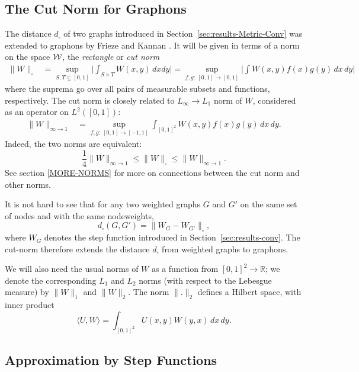 \documentclass[12pt]{article}
\numberwithin{equation}{section}
\def\IO{{\infty\to1}}
\def\R{{\mathbb R}}
\begin{document}
\subsection{The Cut Norm for Graphons}
\label{sec:func-norm}

The distance $d_\square$ of two graphs introduced in
Section~\ref{sec:results-Metric-Conv} was extended to graphons by
Frieze and Kannan \cite{FK}. It will be given in terms of a norm on
the space ${\cal W}$, the {\it rectangle} or {\it cut norm}
\begin{equation}\label{CUTNORM-W}
\begin{aligned}
\|W\|_\square &=\sup_{S,T\subseteq [0,1]} \biggl|\int_{S\times T}
W(x,y)\,dxdy\biggr| =\sup_{f,g:~[0,1]\to [0,1]}\biggl|\int
W(x,y)f(x)g(y)\,dx\,dy\biggr|
\end{aligned}
\end{equation}
where the suprema go over all pairs of measurable subsets and
functions, respectively. The cut norm is closely related to
$L_\infty\to L_1$ norm of $W$, considered as an operator on
$L^2([0,1])$:
\begin{align}\label{IONORM-W}
\|W\|_\IO &=\sup_{f,g:~[0,1]\to [-1,1]} \int_{[0,1]^2}
W(x,y)f(x)g(y)\,dx\,dy.
\end{align}
Indeed, the two norms are equivalent:
\begin{equation}\label{CUT-IO-W}
\frac{1}{4}\|W\|_\IO \le\|W\|_\square \le \|W\|_\IO.
\end{equation}
See section \ref{MORE-NORMS} for more on connections between the
cut norm and other norms.

It is  not hard to see that for any two weighted
graphs $G$ and $G'$
on the same set of nodes and with the same nodeweights,
\begin{equation}
\label{dG=dW_G}
d_\square(G,G')=\|W_G-W_{G'}\|_\square,
\end{equation}
where $W_G$ denotes the step function introduced in
Section~\ref{sec:results-conv}. The cut-norm therefore extends the
distance $d_\square$ from weighted graphs to graphons.

We will also need the usual norms of $W$ as a function from
$[0,1]^2\to\R$; we denote the corresponding $L_1$ and $L_2$ norms
(with respect to the Lebesgue measure) by $\|W\|_1$ and $\|W\|_2$.
The norm $\|.\|_2$ defines a Hilbert space, with inner product
\[
\langle U,W\rangle = \int_{[0,1]^2} U(x,y)W(y,x)\,dx\,dy.
\]

\subsection{Approximation by Step Functions}
\end{document}

